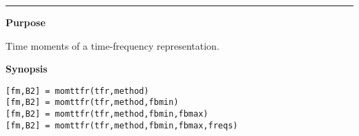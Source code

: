 

\hspace*{-1.6cm}{\Large \bf momttfr}

\vspace*{-.4cm}
\hspace*{-1.6cm}\rule[0in]{16.5cm}{.02cm}
\vspace*{.2cm}



{\bf \large {}\selectfont Purpose}\\
\hspace*{1.5cm}
\begin{minipage}[t]{13.5cm}
Time moments of a time-frequency representation.
\end{minipage}
\vspace*{.5cm}


{\bf \large {}\selectfont Synopsis}\\
\hspace*{1.5cm}
\begin{minipage}[t]{13.5cm}
\begin{verbatim}
[fm,B2] = momttfr(tfr,method)
[fm,B2] = momttfr(tfr,method,fbmin)
[fm,B2] = momttfr(tfr,method,fbmin,fbmax)
[fm,B2] = momttfr(tfr,method,fbmin,fbmax,freqs)
\end{verbatim}
\end{minipage}
\vspace*{.5cm}


